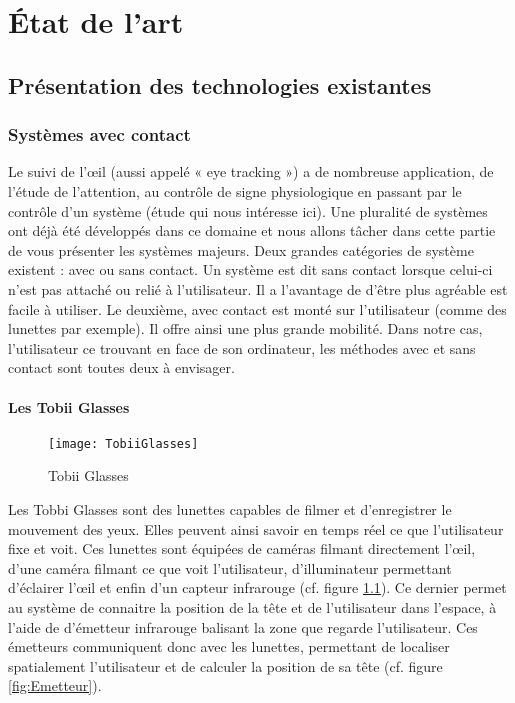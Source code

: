 \chapter{État de l'art}

\section{Présentation des technologies existantes}

\subsection{Systèmes avec contact}

Le suivi de l’œil (aussi appelé « eye tracking ») a de nombreuse application, de l’étude de l’attention, au contrôle de signe physiologique en passant par le contrôle d’un système (étude qui nous intéresse ici).  Une pluralité de systèmes ont déjà été développés dans ce domaine et nous allons tâcher dans cette partie de vous présenter les systèmes majeurs. Deux grandes catégories de système existent : avec ou sans contact. Un système est dit sans contact lorsque celui-ci n’est pas attaché ou relié à l’utilisateur. Il a l’avantage de d’être plus agréable est facile à utiliser. Le deuxième, avec contact est monté sur l’utilisateur (comme des lunettes par exemple). Il offre ainsi une plus grande mobilité. Dans notre cas, l’utilisateur ce trouvant en face de son ordinateur, les méthodes avec et sans contact sont toutes deux à envisager.

\subsubsection{Les Tobii Glasses}

\begin{figure}[h]
  \centering
  \texttt{[image: TobiiGlasses]}
  \caption{Tobii Glasses}
  \label{fig:TG}
\end{figure}

Les Tobbi Glasses sont des lunettes capables de filmer et d’enregistrer le mouvement des yeux. Elles peuvent ainsi savoir en temps réel ce que l’utilisateur fixe et voit.
Ces lunettes sont équipées de caméras filmant directement l’œil, d’une caméra filmant ce que voit l’utilisateur, d’illuminateur permettant d’éclairer l’œil et enfin d’un capteur infrarouge (cf. figure \ref{fig:TG}).
Ce dernier permet au système de connaitre la position de la tête et de l’utilisateur dans l’espace, à l’aide de d’émetteur infrarouge balisant la zone que regarde l’utilisateur. Ces émetteurs communiquent donc avec les lunettes, permettant de localiser spatialement l’utilisateur et de calculer la position de sa tête (cf. figure \ref{fig:Emetteur}). 

